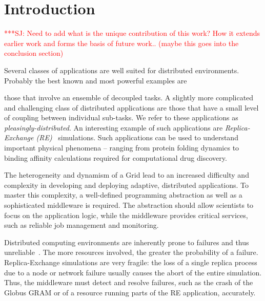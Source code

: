 \documentclass{rspublic}
\newcommand{\jhanote}[1]{ {\textcolor{red} { ***SJ: #1 }}}
\newcommand{\jhanote}[1]{}
\begin{document}
\section{Introduction}


\jhanote{Need to add what is the unique contribution of this work? How
  it extends earlier work and forms the basis of future work.. (maybe
  this goes into the conclusion section)}

Several classes of applications are well suited for distributed
environments. Probably the best known and most powerful examples are



those that involve an ensemble of decoupled tasks.
A slightly more complicated and challenging class of distributed
applications are those that have a small level of coupling between
individual sub-tasks. We refer to these applications as {\it
  pleasingly-distributed}.  An interesting example of such
applications are \emph{Replica-Exchange
  (RE)}~\citep{hansmann,Sugita:1999rm} simulations.  Such applications
can be used to understand important physical phenomena -- ranging from
protein folding dynamics to binding affinity calculations required for
computational drug discovery.

The heterogeneity and dynamism of a Grid lead to an increased
difficulty and complexity in developing and deploying adaptive,
distributed applications.  To master this complexity, a well-defined
programming abstraction as well as a sophisticated middleware is
required. The abstraction should allow scientists to focus on the
application logic, while the middleware provides critical services,
such as reliable job management and monitoring.


Distributed computing environments 
are inherently prone to failures and thus 
unreliable~\citep{schroeder,10.1109/E-SCIENCE.2006.93,DBLP:conf/grid/KhaliliHOSC06}.
The more resources involved, the greater the probability of a failure. 
Replica-Exchange simulations are very fragile: the
loss of a single replica process due to a node or network failure
usually causes the abort of the entire simulation. Thus, the
middleware must detect and resolve failures, such as the crash of the 
Globus GRAM or of a resource running parts of the RE application, 
accurately.
\end{document}
